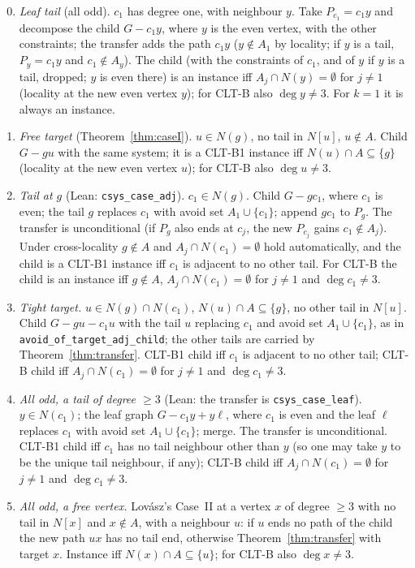 \documentclass[11pt]{amsart}
\theoremstyle{definition}
\begin{document}
\begin{enumerate}[label=(M\arabic*)]\setcounter{enumi}{-1}
\item \emph{Leaf tail} (all odd). $c_1$ has degree one, with neighbour $y$. Take $P_{c_1}=c_1y$ and
decompose the child $G-c_1y$, where $y$ is the even vertex, with the other constraints; the
transfer adds the path $c_1y$ ($y\notin A_1$ by locality; if $y$ is a tail, $P_y=c_1y$ and
$c_1\notin A_y$). The child (with the constraints of $c_1$, and of $y$ if $y$ is a tail, dropped; $y$ is even
there) is an instance iff $A_j\cap N(y)=\emptyset$ for
$j\ne1$ (locality at the new even vertex $y$); for CLT-B also $\deg y\ne3$. For $k=1$ it is
always an instance.
\item \emph{Free target} (Theorem~\ref{thm:caseI}). $u\in N(g)$, no tail in $N[u]$, $u\notin A$.
Child $G-gu$ with the same system; it is a CLT-B1 instance iff $N(u)\cap A\subseteq\{g\}$ (locality at
the new even vertex $u$); for CLT-B also $\deg u\ne3$.
\item \emph{Tail at $g$} (Lean: \texttt{csys\_case\_adj}). $c_1\in N(g)$. Child $G-gc_1$, where
$c_1$ is even; the tail $g$ replaces $c_1$ with avoid set $A_1\cup\{c_1\}$; append $gc_1$ to $P_g$.
The transfer is unconditional (if $P_g$ also ends at $c_j$, the new $P_{c_j}$ gains
$c_1\notin A_j$). Under cross-locality $g\notin A$ and $A_j\cap N(c_1)=\emptyset$ hold
automatically, and the child is a CLT-B1 instance iff $c_1$ is adjacent to no other tail. For CLT-B
the child is an instance iff $g\notin A$, $A_j\cap N(c_1)=\emptyset$ for $j\ne1$ and
$\deg c_1\ne3$.
\item \emph{Tight target.} $u\in N(g)\cap N(c_1)$, $N(u)\cap A\subseteq\{g\}$, no other tail in
$N[u]$. Child $G-gu-c_1u$ with the tail $u$ replacing $c_1$ and avoid set $A_1\cup\{c_1\}$, as in
\texttt{avoid\_of\_target\_adj\_child}; the other tails are carried by Theorem~\ref{thm:transfer}.
CLT-B1 child iff $c_1$ is adjacent to no other tail; CLT-B child iff $A_j\cap N(c_1)=\emptyset$ for
$j\ne1$ and $\deg c_1\ne3$.
\item \emph{All odd, a tail of degree $\ge3$} (Lean: the transfer is \texttt{csys\_case\_leaf}).
$y\in N(c_1)$; the leaf graph $G-c_1y+y\ell$, where $c_1$ is even and the leaf $\ell$ replaces $c_1$
with avoid set $A_1\cup\{c_1\}$; merge. The transfer is unconditional. CLT-B1 child iff $c_1$ has no
tail neighbour other than $y$ (so one may take $y$ to be the unique tail neighbour, if any); CLT-B
child iff $A_j\cap N(c_1)=\emptyset$ for $j\ne1$ and $\deg c_1\ne3$.
\item \emph{All odd, a free vertex.} Lov\'asz's Case~II at a vertex $x$ of degree $\ge3$ with no
tail in $N[x]$ and $x\notin A$, with a neighbour $u$: if $u$ ends no path of the child the new path
$ux$ has no tail end, otherwise Theorem~\ref{thm:transfer} with target $x$. Instance iff
$N(x)\cap A\subseteq\{u\}$; for CLT-B also $\deg x\ne3$.
\end{enumerate}
\end{document}

